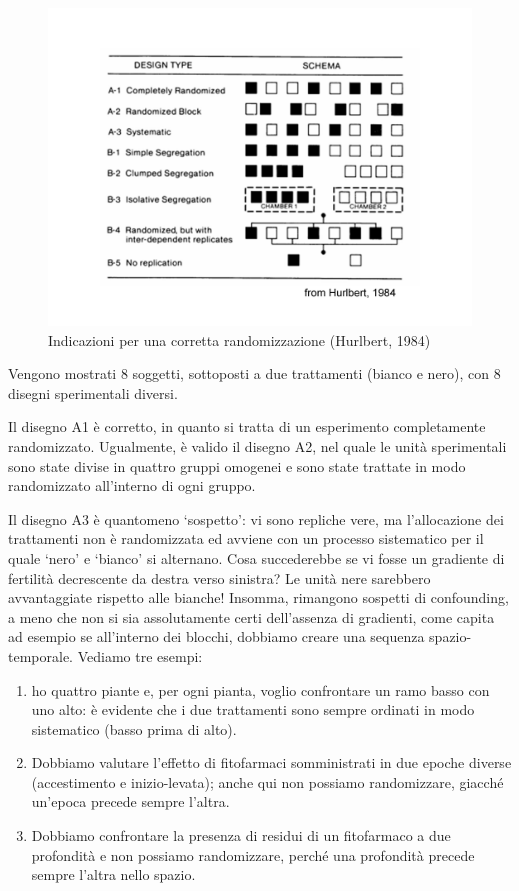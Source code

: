 \documentclass[a4paper,12pt,oneside]{book}
\providecommand{\tightlist}{%
  \setlength{\itemsep}{0pt}\setlength{\parskip}{0pt}}
\theoremstyle{definition}
\theoremstyle{definition}
\theoremstyle{definition}
\theoremstyle{remark}
\begin{document}
\begin{figure}

{\centering \includegraphics[width=0.9\linewidth]{_images/Randomisation} 

}

\caption{Indicazioni per una corretta randomizzazione (Hurlbert, 1984)}\label{fig:figName23}
\end{figure}

Vengono mostrati 8 soggetti, sottoposti a due trattamenti (bianco e
nero), con 8 disegni sperimentali diversi.

Il disegno A1 è corretto, in quanto si tratta di un esperimento
completamente randomizzato. Ugualmente, è valido il disegno A2, nel
quale le unità sperimentali sono state divise in quattro gruppi omogenei
e sono state trattate in modo randomizzato all'interno di ogni gruppo.

Il disegno A3 è quantomeno `sospetto': vi sono repliche vere, ma
l'allocazione dei trattamenti non è randomizzata ed avviene con un
processo sistematico per il quale `nero' e `bianco' si alternano. Cosa
succederebbe se vi fosse un gradiente di fertilità decrescente da destra
verso sinistra? Le unità nere sarebbero avvantaggiate rispetto alle
bianche! Insomma, rimangono sospetti di confounding, a meno che non si
sia assolutamente certi dell'assenza di gradienti, come capita ad
esempio se all'interno dei blocchi, dobbiamo creare una sequenza
spazio-temporale. Vediamo tre esempi:

\begin{enumerate}
\def\labelenumi{\arabic{enumi}.}
\tightlist
\item
  ho quattro piante e, per ogni pianta, voglio confrontare un ramo basso
  con uno alto: è evidente che i due trattamenti sono sempre ordinati in
  modo sistematico (basso prima di alto).
\item
  Dobbiamo valutare l'effetto di fitofarmaci somministrati in due epoche
  diverse (accestimento e inizio-levata); anche qui non possiamo
  randomizzare, giacché un'epoca precede sempre l'altra.
\item
  Dobbiamo confrontare la presenza di residui di un fitofarmaco a due
  profondità e non possiamo randomizzare, perché una profondità precede
  sempre l'altra nello spazio.
\end{enumerate}
\end{document}
